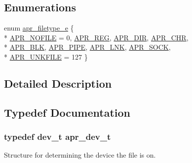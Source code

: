 \subsection*{Enumerations}
\begin{DoxyCompactItemize}
\item 
enum \hyperlink{group__apr__file__info_gae3f0ce3014337a52b39852f8bf81ca7c}{apr\+\_\+filetype\+\_\+e} \{ \\*
\hyperlink{group__apr__file__info_ggae3f0ce3014337a52b39852f8bf81ca7cae5877c29ba5fd483edbde0c51c0ac5e9}{A\+P\+R\+\_\+\+N\+O\+F\+I\+LE} = 0, 
\hyperlink{group__apr__file__info_ggae3f0ce3014337a52b39852f8bf81ca7ca9a2849ad21618c937683c1ffe13a6257}{A\+P\+R\+\_\+\+R\+EG}, 
\hyperlink{group__apr__file__info_ggae3f0ce3014337a52b39852f8bf81ca7cae2ee810fa994ae64b8fcc6b68d3ae540}{A\+P\+R\+\_\+\+D\+IR}, 
\hyperlink{group__apr__file__info_ggae3f0ce3014337a52b39852f8bf81ca7cadb769ffbe8659cbecf7ebf376d098d37}{A\+P\+R\+\_\+\+C\+HR}, 
\\*
\hyperlink{group__apr__file__info_ggae3f0ce3014337a52b39852f8bf81ca7ca20ea6a09a69785a7cd19fd05243c1c8d}{A\+P\+R\+\_\+\+B\+LK}, 
\hyperlink{group__apr__file__info_ggae3f0ce3014337a52b39852f8bf81ca7ca247719668cd02286a6a0ed767c30ce77}{A\+P\+R\+\_\+\+P\+I\+PE}, 
\hyperlink{group__apr__file__info_ggae3f0ce3014337a52b39852f8bf81ca7ca2b55a6db64d814bf08d5a56b026a8176}{A\+P\+R\+\_\+\+L\+NK}, 
\hyperlink{group__apr__file__info_ggae3f0ce3014337a52b39852f8bf81ca7cadd5d86c1e616fe159a7ec04e0ddc70db}{A\+P\+R\+\_\+\+S\+O\+CK}, 
\\*
\hyperlink{group__apr__file__info_ggae3f0ce3014337a52b39852f8bf81ca7ca3347d2110d62ce464ddf1ae38759e6b0}{A\+P\+R\+\_\+\+U\+N\+K\+F\+I\+LE} = 127
 \}
\end{DoxyCompactItemize}


\subsection{Detailed Description}


\subsection{Typedef Documentation}
\subsubsection[{\texorpdfstring{apr\+\_\+dev\+\_\+t}{apr_dev_t}}]{\setlength{\rightskip}{0pt plus 5cm}typedef dev\+\_\+t {\bf apr\+\_\+dev\+\_\+t}}\hypertarget{group__apr__file__info_gae2c25c4b679613081599f776efa96c4a}{}\label{group__apr__file__info_gae2c25c4b679613081599f776efa96c4a}
Structure for determining the device the file is on. 
